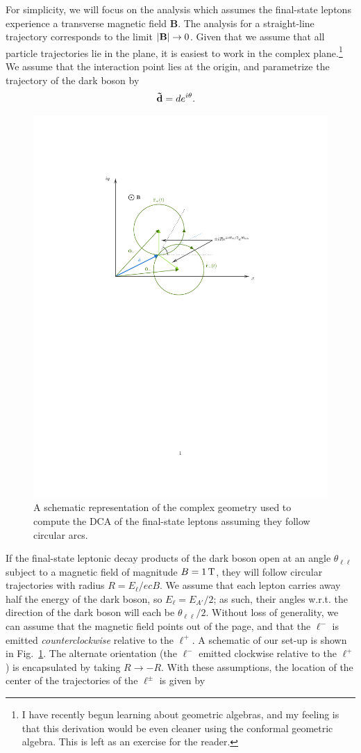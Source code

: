 For simplicity, we will focus on the analysis which assumes the final-state leptons experience a transverse magnetic field {\bf B}. The analysis for a straight-line trajectory corresponds to the limit $|{\bf B}| \rightarrow 0$. Given that we assume that all particle trajectories lie in the plane, it is easiest to work in the complex plane.\footnote{I have recently begun learning about geometric algebras, and my feeling is that this derivation would be even cleaner using the conformal geometric algebra. This is left as an exercise for the reader.} We assume that the interaction point lies at the origin, and parametrize the trajectory of the dark boson by
\begin{align}
    {\bf \tilde{d}} &= d e^{i\theta}.
\end{align}
\begin{figure}[t!]
    \centering
    \includegraphics[width=0.8\linewidth]{figures/appendixB/Complex_Geometry.pdf}
    \caption[DCA Analysis Using Complex Geometry]{A schematic representation of the complex geometry used to compute the DCA of the final-state leptons assuming they follow circular arcs.}
    \label{fig:geom_fig}
\end{figure}
If the final-state leptonic decay products of the dark boson open at an angle $\theta_{\ell\ell}$ subject to a magnetic field of magnitude $B = 1\,{\rm T}$, they will follow circular trajectories with radius $R = E_\ell/ecB$. We assume that each lepton carries away half the energy of the dark boson, so $E_\ell = E_{A'}/2$; as such, their angles w.r.t. the direction of the dark boson will each be $\theta_{\ell\ell}/2$. Without loss of generality, we can assume that the magnetic field points out of the page, and that the $\ell^-$ is emitted {\it counterclockwise} relative to the $\ell^+$. A schematic of our set-up is shown in Fig.~\ref{fig:geom_fig}. The alternate orientation (the $\ell^-$ emitted clockwise relative to the $\ell^+$) is encapsulated by taking $R \rightarrow -R$. With these assumptions, the location of the center of the trajectories of the $\ell^\pm$ is given by
